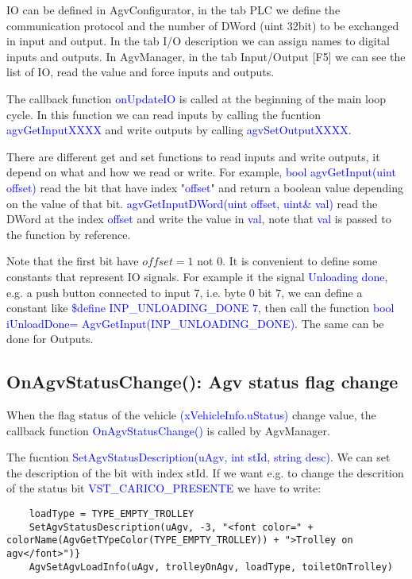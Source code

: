 IO can be defined in AgvConfigurator, in the tab PLC we define the communication protocol and the number of DWord (uint 32bit) to be exchanged in input and output. In the tab I/O description we can assign names to digital inputs and outputs.
In AgvManager, in the tab Input/Output [F5] we can see the list of IO, read the value and force inputs and outputs.

The callback function \textcolor{blue}{onUpdateIO} is called at the beginning of the main loop cycle. In this function we can read inputs by calling the fucntion \textcolor{blue}{agvGetInputXXXX} and write outputs by calling \textcolor{blue}{agvSetOutputXXXX}.

There are different get and set functions to read inputs and write outputs, it depend on what and how we read or write. For example, \textcolor{blue}{bool agvGetInput(uint offset)} read the bit that have index "\textcolor{blue}{offset}" and return a boolean value depending on the value of that bit. \textcolor{blue}{agvGetInputDWord(uint offset, uint\& val)} read the DWord at the index \textcolor{blue}{offset} and write the value in \textcolor{blue}{val}, note that \textcolor{blue}{val} is passed to the function by reference.

Note that the first bit have $offset = 1$ not $0$. It is convenient to define some constants that represent IO signals. For example it the signal \textcolor{blue}{Unloading done}, e.g. a push button connected to input 7, i.e. byte 0 bit 7, we can define a constant like \textcolor{blue}{\$define INP\_UNLOADING\_DONE 7}, then call the function \textcolor{blue}{bool iUnloadDone= AgvGetInput(INP\_UNLOADING\_DONE)}. The same can be done for Outputs.


%
\subsection{OnAgvStatusChange(): Agv status flag change}
When the flag status of the vehicle \textcolor{blue}{(xVehicleInfo.uStatus)} change value, the callback function \textcolor{blue}{OnAgvStatusChange()} is called by AgvManager.

The fucntion \textcolor{blue}{SetAgvStatusDescription(uAgv, int stId, string desc)}. We can set the description of the bit with index stId.
If we want e.g. to change the descrition of the status bit \textcolor{blue}{VST\_CARICO\_PRESENTE} we have to write: 
\begin{lstlisting}
	loadType = TYPE_EMPTY_TROLLEY
	SetAgvStatusDescription(uAgv, -3, "<font color=" + colorName(AgvGetTYpeColor(TYPE_EMPTY_TROLLEY)) + ">Trolley on agv</font>")}
	AgvSetAgvLoadInfo(uAgv, trolleyOnAgv, loadType, toiletOnTrolley)
\end{lstlisting}

